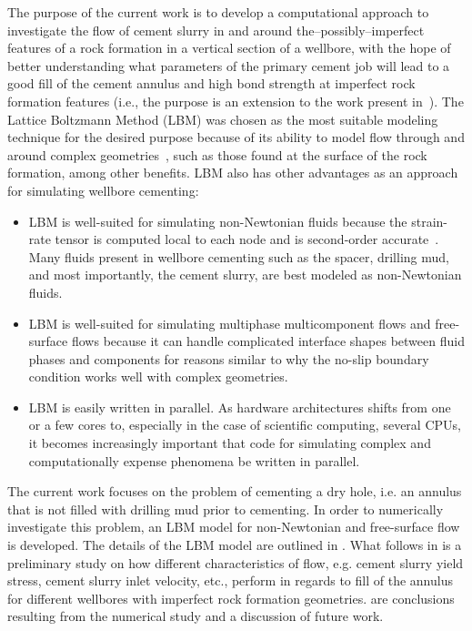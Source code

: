 \documentclass[pdftex,ms]{pittetd}
\begin{document}
The purpose of the current work is to develop a computational approach to investigate the flow of cement slurry in and around the--possibly--imperfect features of a rock formation in a vertical section of a wellbore, with the hope of better understanding what parameters of the primary cement job will lead to a good fill of the cement annulus and high bond strength at imperfect rock formation features (i.e., the purpose is an extension to the work present in~\citet{grasinger2015simulation}).
The Lattice Boltzmann Method (LBM) was chosen as the most suitable modeling technique for the desired purpose because of its ability to model flow through and around complex geometries~\cite{thorne2006lattice}, such as those found at the surface of the rock formation, among other benefits.
LBM also has other advantages as an approach for simulating wellbore cementing:
\begin{itemize}
\item LBM is well-suited for simulating non-Newtonian fluids because the strain-rate tensor is computed local to each node and is second-order accurate~\cite{kruger2009shear,kruger2010second}.
Many fluids present in wellbore cementing such as the spacer, drilling mud, and most importantly, the cement slurry, are best modeled as non-Newtonian fluids.
\item LBM is well-suited for simulating multiphase multicomponent flows and free-surface flows because it can handle complicated interface shapes between fluid phases and components for reasons similar to why the no-slip boundary condition works well with complex geometries.
\item LBM is easily written in parallel.
As hardware architectures shifts from one or a few cores to, especially in the case of scientific computing, several CPUs, it becomes increasingly important that code for simulating complex and computationally expense phenomena be written in parallel.
\end{itemize}
The current work focuses on the problem of cementing a dry hole, i.e. an annulus that is not filled with drilling mud prior to cementing.
In order to numerically investigate this problem, an LBM model for non-Newtonian and free-surface flow is developed.
The details of the LBM model are outlined in .
What follows in  is a preliminary study on how different characteristics of flow, e.g. cement slurry yield stress, cement slurry inlet velocity, etc., perform in regards to fill of the annulus for different wellbores with imperfect rock formation geometries.
 are conclusions resulting from the numerical study and a discussion of future work.
\end{document}
